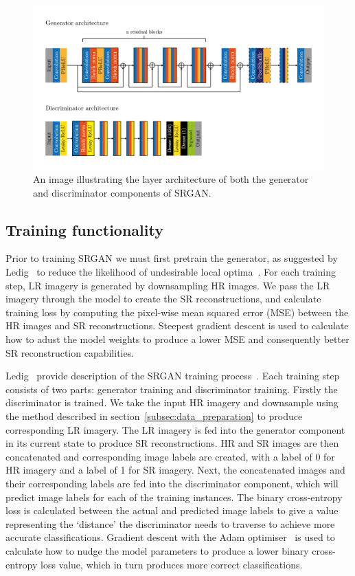 \begin{figure}
    \includegraphics[width=\linewidth]{./assets/srgan_architecture.png}
    \caption{An image illustrating the layer architecture of both the generator and discriminator components of SRGAN.}
    \label{fig:srgan_architecture}
\end{figure}

\subsection{Training functionality}\label{subsec:training_functionality}
Prior to training SRGAN we must first pretrain the generator, as suggested by Ledig \etal\ to reduce the likelihood of undesirable local optima~\cite{srgan}. For each training step, LR imagery is generated by downsampling HR images. We pass the LR imagery through the model to create the SR reconstructions, and calculate training loss by computing the pixel-wise mean squared error (MSE) between the HR images and SR reconstructions. Steepest gradient descent is used to calculate how to adust the model weights to produce a lower MSE and consequently better SR reconstruction capabilities.

Ledig \etal\ provide description of the SRGAN training process~\cite{srgan}. Each training step consists of two parts: generator training and discriminator training. Firstly the discriminator is trained. We take the input HR imagery and downsample using the method described in section~\ref{subsec:data_preparation} to produce corresponding LR imagery. The LR imagery is fed into the generator component in its current state to produce SR reconstructions. HR and SR images are then concatenated and corresponding image labels are created, with a label of 0 for HR imagery and a label of 1 for SR imagery. Next, the concatenated images and their corresponding labels are fed into the discriminator component, which will predict image labels for each of the training instances. The binary cross-entropy loss is calculated between the actual and predicted image labels to give a value representing the `distance' the discriminator needs to traverse to achieve more accurate classifications. Gradient descent with the Adam optimiser~\cite{adamOptimiser} is used to calculate how to nudge the model parameters to produce a lower binary cross-entropy loss value, which in turn produces more correct classifications.

